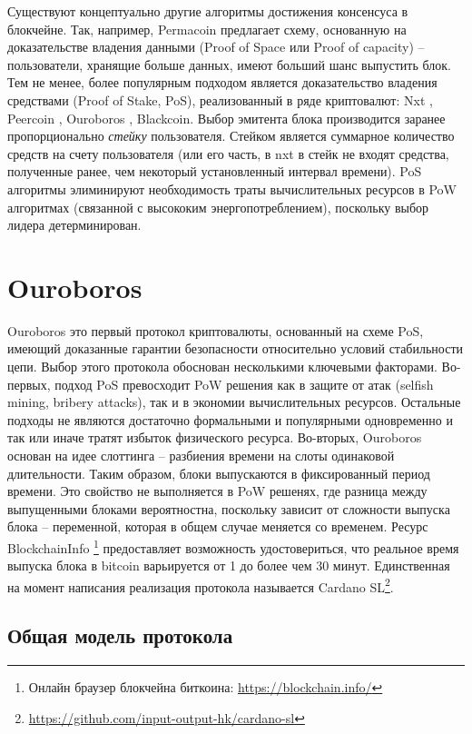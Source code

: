 \documentclass[specification,annotation]{itmo-student-thesis}
\begin{document}
Существуют концептуально другие алгоритмы достижения консенсуса в
блокчейне. Так, например, Permacoin \cite{permacoin} предлагает схему,
основанную на доказательстве владения данными (Proof of Space или
Proof of capacity) -- пользователи, хранящие больше данных, имеют
больший шанс выпустить блок. Тем не менее, более популярным подходом
является доказательство владения средствами (Proof of Stake, PoS),
реализованный в ряде криптовалют: Nxt \cite{nxt}, Peercoin
\cite{king2012ppcoin}, Ouroboros \cite{ouroboros}, Blackcoin. Выбор
эмитента блока производится заранее пропорционально {\it стейку}
пользователя. Стейком является суммарное количество средств на счету
пользователя (или его часть, в nxt в стейк не входят средства,
полученные ранее, чем некоторый установленный интервал времени). PoS
алгоритмы элиминируют необходимость траты вычислительных ресурсов в
PoW алгоритмах (связанной с высококим энергопотреблением), поскольку
выбор лидера детерминирован.

\section{Ouroboros}

Ouroboros \cite{ouroboros} это первый протокол криптовалюты,
основанный на схеме PoS, имеющий доказанные гарантии безопасности
относительно условий стабильности цепи. Выбор этого протокола
обоснован несколькими ключевыми факторами. Во-первых, подход PoS
превосходит PoW решения как в защите от атак (selfish mining, bribery
attacks), так и в экономии вычислительных ресурсов. Остальные подходы
не являются достаточно формальными и популярными одновременно и так
или иначе тратят избыток физического ресурса. Во-вторых, Ouroboros
основан на идее слоттинга -- разбиения времени на слоты одинаковой
длительности. Таким образом, блоки выпускаются в фиксированный период
времени. Это свойство не выполняется в PoW решенях, где разница между
выпущенными блоками вероятностна, поскольку зависит от сложности
выпуска блока -- переменной, которая в общем случае меняется со
временем. Ресурс BlockchainInfo \footnote{Онлайн браузер блокчейна
  биткоина: \url{https://blockchain.info/}} предоставляет возможность
удостовериться, что реальное время выпуска блока в bitcoin варьируется
от 1 до более чем 30 минут. Единственная на момент написания
реализация протокола называется Cardano
SL\footnote{\url{https://github.com/input-output-hk/cardano-sl}}.

\subsection{Общая модель протокола}
\end{document}
